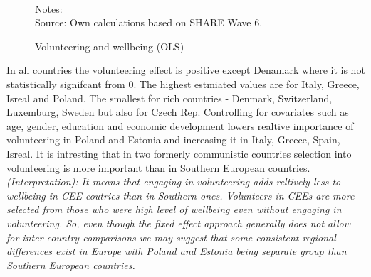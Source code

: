 \documentclass[10pt, letterpaper]{article}
\begin{document}
\begin{spacing}{1.4}
\begin{figure}[H]
\centering
\caption{Volunteering and wellbeing (OLS)} 
\label{fig:casp_ols}
\begin{minipage}{1\linewidth}
 \quad
{}~\\
{\footnotesize Notes: }~\\
{\footnotesize Source: Own calculations based on SHARE Wave 6.}
\end{minipage}
\end{figure} 
 
In all countries the volunteering effect is positive except Denamark where it is not statistically signifcant from 0. The highest estmiated values are for Italy, Greece, Isreal and Poland. The smallest for rich countries - Denmark, Switzerland, Luxemburg, Sweden but also for Czech Rep. Controlling for covariates such as age, gender, education and economic development lowers realtive importance of volunteering in Poland and Estonia and increasing it in Italy, Greece, Spain, Isreal. It is intresting that in two formerly communistic countries selection into volunteering is more important than in Southern European countries. \textit{(Interpretation): It means that engaging in volunteering adds reltively less to wellbeing in CEE coutries than in Southern ones. Volunteers in CEEs are more selected from those who were high level of wellbeing even without engaging in volunteering. So, even though the fixed effect approach generally does not allow for inter-country comparisons we may suggest that some consistent regional differences exist in Europe with Poland and Estonia being separate group than Southern European countries.} \\


\end{spacing}
\end{document}
